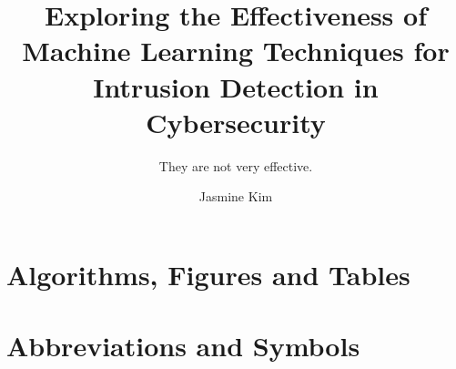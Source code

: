 \documentclass[
	USenglish,             %
	accentcolor=9b,        %
	BCOR=0mm,              %
	class=report,          %
	custommargins=false,   %
	fontsize=11pt,
	instbox=true,          %
	marginpar=false,       %
	parskip=half-,         %
	pdfa=true,             %
	ruledheaders=section,  %
	thesis={
	    type=master,             %
	    hide-architecture-note,  %
    },
	oneside,               %
]{tudapub}
\title{Exploring the Effectiveness of Machine Learning Techniques for Intrusion Detection in Cybersecurity}  %
\subtitle{They are not very effective.}  %
\author[J. Kim]{Jasmine Kim}  %
\begin{document}
	{
		\maketitle
	}

	\cleardoublepage
	{
		
		
		
	}
	\glsresetall[abbreviations]

	\cleardoublepage
	{
		\tableofcontents

		\chapter*{Algorithms, Figures and Tables}
			\listofalgorithms
			\listoffigures
			\listoftables

		\chapter*{Abbreviations and Symbols}
			\printunsrtglossary[type=abbreviations]
			\printunsrtglossary[type=symbols]
	}

	\cleardoublepage
	{
		
		
		
		
		
		
		
	}

	\cleardoublepage
	{
		\printbibliography
	}

	\cleardoublepage
	{
		\appendix
		
	}
\end{document}

